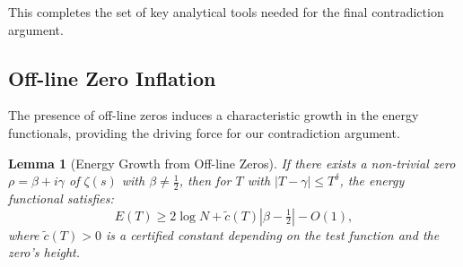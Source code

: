 \documentclass[11pt,hyp,]{nyjm}
\newtheorem{lemma}[theorem]{Lemma}
\begin{document}
This completes the set of key analytical tools needed for the final contradiction argument.

\subsection{Off-line Zero Inflation}

The presence of off-line zeros induces a characteristic growth in the energy functionals, providing the driving force for our contradiction argument.

\begin{lemma}[Energy Growth from Off-line Zeros]\label{lem:offline-inflation}
If there exists a non-trivial zero $\rho = \beta + i\gamma$ of $\zeta(s)$ with $\beta \neq \tfrac12$, then for $T$ with $|T - \gamma| \leq T^\delta$, the energy functional satisfies:
\[
E(T) \geq 2\log N + \tilde{c}(T)|\beta - \tfrac12| - O(1),
\]
where $\tilde{c}(T) > 0$ is a certified constant depending on the test function and the zero's height.
\end{lemma}
\end{document}
